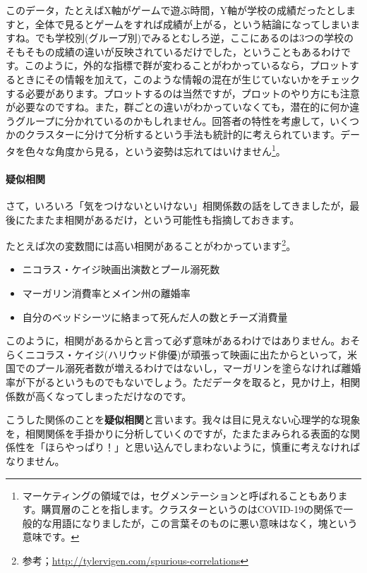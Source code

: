 \documentclass{ltjsbook}
\begin{document}
このデータ，たとえばX軸がゲームで遊ぶ時間，Y軸が学校の成績だったとしますと，全体で見るとゲームをすれば成績が上がる，という結論になってしまいますね。でも学校別(グループ別)でみるとむしろ逆，ここにあるのは3つの学校のそもそもの成績の違いが反映されているだけでした，ということもあるわけです。このように，外的な指標で群が変わることがわかっているなら，プロットするときにその情報を加えて，このような情報の混在が生じていないかをチェックする必要があります。プロットするのは当然ですが，プロットのやり方にも注意が必要なのですね。また，群ごとの違いがわかっていなくても，潜在的に何か違うグループに分かれているのかもしれません。回答者の特性を考慮して，いくつかのクラスターに分けて分析するという手法も統計的に考えられています。データを色々な角度から見る，という姿勢は忘れてはいけません\footnote{マーケティングの領域では，セグメンテーションと呼ばれることもあります。購買層のことを指します。クラスターというのはCOVID-19の関係で一般的な用語になりましたが，この言葉そのものに悪い意味はなく，塊という意味です。}。

\paragraph{疑似相関}

さて，いろいろ「気をつけないといけない」相関係数の話をしてきましたが，最後にたまたま相関があるだけ，という可能性も指摘しておきます。

たとえば次の変数間には高い相関があることがわかっています\footnote{参考；\url{http://tylervigen.com/spurious-correlations}}。
\begin{itemize}
	\item ニコラス・ケイジ映画出演数とプール溺死数
	\item マーガリン消費率とメイン州の離婚率
	\item 自分のベッドシーツに絡まって死んだ人の数とチーズ消費量
\end{itemize}

このように，相関があるからと言って必ず意味があるわけではありません。おそらくニコラス・ケイジ(ハリウッド俳優)が頑張って映画に出たからといって，米国でのプール溺死者数が増えるわけではないし，マーガリンを塗らなければ離婚率が下がるというものでもないでしょう。ただデータを取ると，見かけ上，相関係数が高くなってしまっただけなのです。

こうした関係のことを\textbf{疑似相関}と言います。我々は目に見えない心理学的な現象を，相関関係を手掛かりに分析していくのですが，たまたまみられる表面的な関係性を「ほらやっぱり！」と思い込んでしまわないように，慎重に考えなければなりません。
\end{document}
